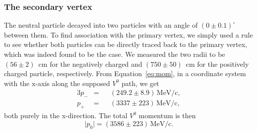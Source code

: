 \documentclass[twocolumn]{article}
\begin{document}
\subsubsection{The secondary vertex}
The neutral particle decayed into two particles with an angle of $(0\pm 0.1)^{\circ} $ between them. To find association with the primary vertex, we simply used a rule to see whether both particles can be directly traced back to the primary vertex, which was indeed found to be the case. We measured the two radii to be $(56 \pm 2)$~cm for the negatively charged and $(750 \pm 50)$~cm for the positively charged particle, respectively. From Equation~\ref{eq:mom}, in a coordinate system with the x-axis along the supposed $V^0$ path, we get 
\begin{alignat*}{3}
p_- &= &&(249.2 \pm 8.9)\, \text{MeV/c},\\
p_+ &= &&(3337 \pm 223)\, \text{MeV/c},
\end{alignat*}
both purely in the x-direction. The total $V^0$ momentum is then
\begin{equation*}
\vert p_0 \vert = (3586 \pm 223)\, \text{MeV/c}.
\end{equation*}
\end{document}
